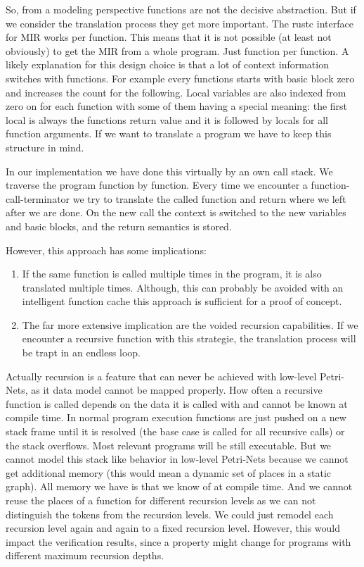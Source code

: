So, from a modeling perspective functions are not the decisive abstraction.
But if we consider the translation process they get more important.
The rustc interface for MIR works per function.
This means that it is not possible (at least not obviously) to get the MIR from a whole program.
Just function per function.
A likely explanation for this design choice is that a lot of context information switches with functions.
For example every functions starts with basic block zero and increases the count for the following.
Local variables are also indexed from zero on for each function with some of them having a special meaning:
the first local is always the functions return value and it is followed by locals for all function arguments.
If we want to translate a program we have to keep this structure in mind.

In our implementation we have done this virtually by an own call stack.
We traverse the program function by function.
Every time we encounter a function-call-terminator we try to translate the called function and return where we left after we are done.
On the new call the context is switched to the new variables and basic blocks, and the return semantics is stored.

However, this approach has some implications:
\begin{enumerate}
    \item If the same function is called multiple times in the program, it is also translated multiple times.
    Although, this can probably be avoided with an intelligent function cache this approach is sufficient for a proof of concept.
    \item The far more extensive implication are the voided recursion capabilities.
    If we encounter a recursive function with this strategie, the translation process will be trapt in an endless loop.
\end{enumerate}
Actually recursion is a feature that can never be achieved with low-level Petri-Nets, as it data model cannot be mapped properly.
How often a recursive function is called depends on the data it is called with and cannot be known at compile time.
In normal program execution functions are just pushed on a new stack frame until it is resolved (the base case is called for all recursive calls) or the stack overflows.
Most relevant programs will be still executable.
But we cannot model this stack like behavior in low-level Petri-Nets because we cannot get additional memory (this would mean a dynamic set of places in a static graph).
All memory we have is that we know of at compile time.
And we cannot reuse the places of a function for different recursion levels as we can not distinguish the tokens from the recursion levels.
We could just remodel each recursion level again and again to a fixed recursion level.
However, this would impact the verification results, since a property might change for programs with different maximum recursion depths.

